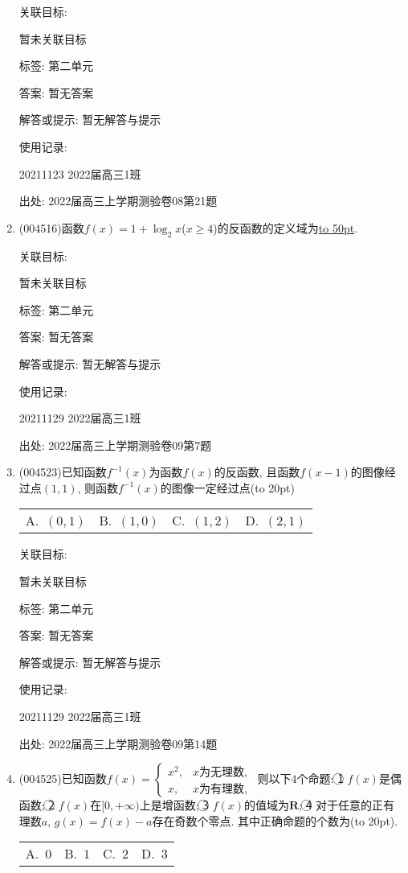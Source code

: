 \documentclass[10pt,a4paper]{article}
\newcommand{\blank}[1]{\underline{\hbox to #1pt{}}}
\newcommand{\bracket}[1]{(\hbox to #1pt{})}
\newcommand{\fourch}[4]{\par\begin{tabular}{p{.23\textwidth}p{.23\textwidth}p{.23\textwidth}p{.23\textwidth}}
A.~#1 &B.~#2& C.~#3& D.~#4
\end{tabular}}
\begin{document}
\begin{enumerate}[1.]
关联目标:

暂未关联目标



标签: 第二单元

答案: 暂无答案

解答或提示: 暂无解答与提示

使用记录:

20211123	2022届高三1班			


出处: 2022届高三上学期测验卷08第21题
\item { (004516)}函数$f(x)=1+\log_2x$($x\ge 4$)的反函数的定义域为\blank{50}.


关联目标:

暂未关联目标



标签: 第二单元

答案: 暂无答案

解答或提示: 暂无解答与提示

使用记录:

20211129	2022届高三1班	


出处: 2022届高三上学期测验卷09第7题
\item { (004523)}已知函数$f^{-1}(x)$为函数$f(x)$的反函数, 且函数$f(x-1)$的图像经过点$(1,1)$, 则函数$f^{-1}(x)$的图像一定经过点\bracket{20}
\fourch{$(0,1)$}{$(1,0)$}{$(1,2)$}{$(2,1)$}


关联目标:

暂未关联目标



标签: 第二单元

答案: 暂无答案

解答或提示: 暂无解答与提示

使用记录:

20211129	2022届高三1班	


出处: 2022届高三上学期测验卷09第14题
\item { (004525)}已知函数$f(x)=\begin{cases} x^2, & x\text{为无理数}, \\ x, &x\text{为有理数},   \end{cases}$ 则以下$4$个命题:
\textcircled{1} $f(x)$是偶函数; \textcircled{2} $f(x)$在$[0,+\infty)$上是增函数; \textcircled{3} $f(x)$的值域为$\mathbf{R}$; \textcircled{4} 对于任意的正有理数$a$, $g(x)=f(x)-a$存在奇数个零点.
其中正确命题的个数为\bracket{20}.
\fourch{$0$}{$1$}{$2$}{$3$}



\end{enumerate}
\end{document}
